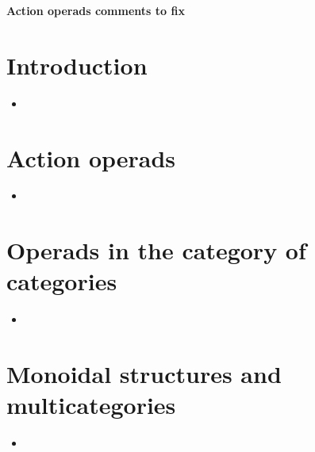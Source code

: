 \documentclass{amsart}
\begin{document}
\begin{center}
\begin{Large}
\textbf{Action operads comments to fix}
\end{Large}
\end{center}
\vskip1cm

\section{ Introduction}
\begin{itemize}
\item

\end{itemize}
\section{ Action operads}
\begin{itemize}
\item

\end{itemize}

\section{Operads in the category of categories}
\begin{itemize}
\item

\end{itemize}

\section{ Monoidal structures and multicategories}
\begin{itemize}
\item

\end{itemize}
\end{document}

